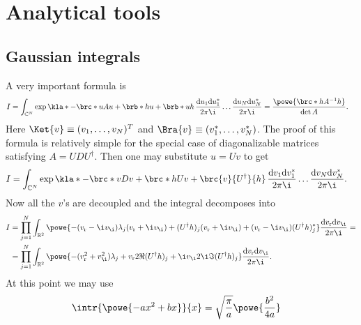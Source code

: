 \documentclass[english, parskip=full]{scrartcl}
\title{\titel}
\author{\autor}
\date{\today}
\renewcommand{\r}{\text{r}}
\begin{document}
\maketitle  %

\section{Analytical tools}
\subsection{Gaussian integrals}
A very important formula is
\begin{align}
I &= \int_{\mathbb{C}^N} \exp\kla*{-\brc*{u}{A}{u} + \brb*{h}{u} + \brb*{u}{h}  } \, \frac{\mathrm{d}u_1\mathrm{d}u_1^\ast}{2\pi\i} \dots \frac{\mathrm{d}u_N\mathrm{d}u_N^\ast}{2\pi\i} = \frac{\powe{ \brc*{h}{A^{-1}}{h} }}{\det A}. \label{eqn:exp minus u ast A u plus h ast u plus u ast h}
\end{align}
Here $\Ket{v} \equiv (v_1,\dots,v_N)^T$ and $\Bra{v} \equiv (v_1^\ast, \dots, v_N^\ast)$.
The proof of this formula is relatively simple for the special case of diagonalizable matrices satisfying $A = UDU^\dagger$.
Then one may substitute $u = Uv$ to get
\begin{align}
I &= \int_{\mathbb{C}^N} \exp\kla*{-\brc*{v}{D}{v} + \brc*{h}{U}{v} + \brc{v}{U^\dagger}{h}  } \, \frac{\mathrm{d}v_1\mathrm{d}v_1^\ast}{2\pi\i} \dots \frac{\mathrm{d}v_N\mathrm{d}v_N^\ast}{2\pi\i}.
\end{align}
Now all the $v$'s are decoupled and the integral decomposes into
\begin{align}
I &= \prod_{j=1}^N \int_{\mathbb{R}^2} \powe{-(v_\r - \i v_\i) \lambda_j (v_\r + \i v_\i) + (U^\dagger h)_j (v_\r + \i v_\i) + (v_\r - \i v_\i) (U^\dagger h)_j^\ast } \frac{\mathrm{d}v_\r\mathrm{d}v_\i}{2\pi\i} = \\
&= \prod_{j=1}^N \int_{\mathbb{R}^2} \powe{-(v_\r^2 + v_\i^2) \lambda_j +  v_\r  2\Re (U^\dagger h)_j + \i v_\i 2\i\Im (U^\dagger h)_j } \frac{\mathrm{d}v_\r\mathrm{d}v_\i}{2\pi\i}.
\end{align}
At this point we may use 
\begin{align}
\intr{\powe{-ax^2 + bx}}{x} &= \sqrt{\frac{\pi}{a}} \powe{\frac{b^2}{4a}} \label{eqn:e to the minus a x squared plus b x}
\end{align}
\end{document}
